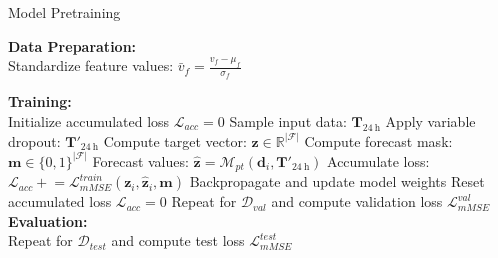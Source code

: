 \begin{algorithm}[h]
\caption{Model Pretraining}
\label{algorithm:pretrain}

\textbf{Data Preparation:} \\
\nl Standardize feature values: \(\bar{v}_f = \frac{v_f - \mu_f}{\sigma_f}\) \;

\textbf{Training:} \\
 {
    \nl Initialize accumulated loss \(\mathcal{L}_{acc} = 0\) \;
     {
        \nl Sample input data: \( \mathbf{T}_{\qty{24}{\hour}} \)  \label{alg:pretrain_epoch_start}
        \nl Apply variable dropout: \( \mathbf{T}'_{\qty{24}{\hour}} \) 
        \nl Compute target vector: \( \mathbf{z} \in \mathbb{R}^{|\mathcal{F}|} \) 
        \nl Compute forecast mask: \(\mathbf{m} \in \{0, 1\}^{|\mathcal{F}|}\) \;
        \nl Forecast values: \(\hat{\mathbf{z}} = \mathcal{M}_{pt}(\mathbf{d}_i,\mathbf{T}'_{\qty{24}{\hour}}) \) \;
        \nl Accumulate loss: \(\mathcal{L}_{acc} \mathrel{+} = \mathcal{L}^{train}_{mMSE} (\mathbf{z}_i, \hat{\mathbf{z}}_i, \mathbf{m}) \)  \label{alg:pretrain_compute_loss}
         {
            \nl Backpropagate and update model weights \;
            \nl Reset accumulated loss \(\mathcal{L}_{acc} = 0\) \;
        }
    }
    \nl Repeat  for \(\mathcal{D}_{val}\) and compute validation loss \(\mathcal{L}^{val}_{mMSE} \) \;
}
\textbf{Evaluation:} \\
\nl Repeat  for \(\mathcal{D}_{test}\) and compute test loss \(\mathcal{L}^{test}_{mMSE} \) \;
\end{algorithm}
